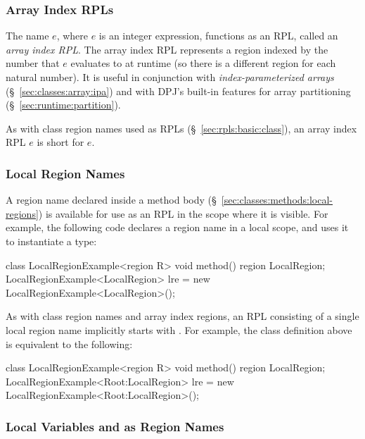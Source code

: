 \subsubsection{Array Index RPLs%
\label{sec:rpls:basic:array}}

The name \kwd{[}$e$\kwd{]}, where $e$ is an integer expression,
functions as an RPL, called an \emph{array index RPL}.  The array
index RPL represents a region indexed by the number that $e$
evaluates to at runtime (so there is a different region for each
natural number).  It is useful in conjunction with
\emph{index-parameterized arrays} (\S~\ref{sec:classes:array:ipa}) and
with DPJ's built-in features for array partitioning
(\S~\ref{sec:runtime:partition}).

As with class region names used as RPLs
(\S~\ref{sec:rpls:basic:class}), an array index RPL \kwd{[}$e$\kwd{]}
is short for \kwd{Root:[}$e$\kwd{]}.

\subsubsection{Local Region Names%
\label{sec:rpls:basic:local}}


A region name declared inside a method body
(\S~\ref{sec:classes:methods:local-regions}) is available for use as
an RPL in the scope where it is visible.  For example, the following
code declares a region name  in a local scope, and
uses it to instantiate a type:
%
\begin{dpjlisting}
class LocalRegionExample<region R> {
  void method() {
    region LocalRegion;
    LocalRegionExample<LocalRegion> lre = 
      new LocalRegionExample<LocalRegion>();
  }
}
\end{dpjlisting}
%

As with class region names and array index regions, an RPL consisting
of a single local region name implicitly starts with .  For
example, the class definition above is equivalent to the following:
%
\begin{dpjlisting}
class LocalRegionExample<region R> {
  void method() {
    region LocalRegion;
    LocalRegionExample<Root:LocalRegion> lre = 
      new LocalRegionExample<Root:LocalRegion>();
  }
}
\end{dpjlisting}
%


\subsubsection{ Local Variables and  as Region Names%
\label{sec:rpls:basic:var}}

